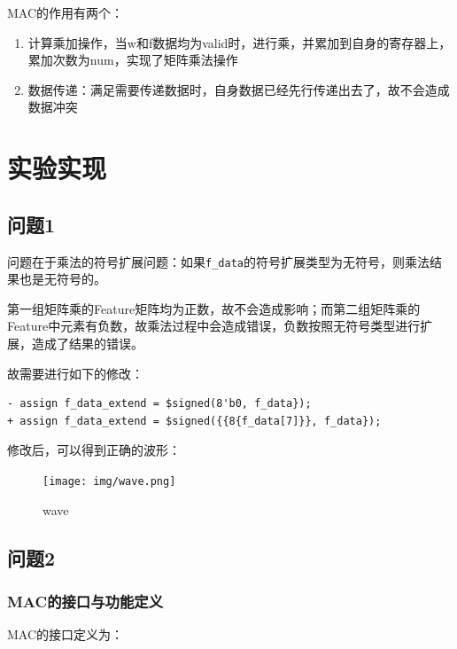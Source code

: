 \documentclass[12pt,a4paper]{article}
\begin{document}
MAC的作用有两个：

\begin{enumerate}
\item
  计算乘加操作，当w和f数据均为valid时，进行乘，并累加到自身的寄存器上，累加次数为num，实现了矩阵乘法操作
\item
  数据传递：满足需要传递数据时，自身数据已经先行传递出去了，故不会造成数据冲突
\end{enumerate}

\section{实验实现}

\subsection{问题1}

问题在于乘法的符号扩展问题：如果\texttt{f\_data}的符号扩展类型为无符号，则乘法结果也是无符号的。

第一组矩阵乘的Feature矩阵均为正数，故不会造成影响；而第二组矩阵乘的Feature中元素有负数，故乘法过程中会造成错误，负数按照无符号类型进行扩展，造成了结果的错误。

故需要进行如下的修改：

\begin{lstlisting}
- assign f_data_extend = $signed(8'b0, f_data});
+ assign f_data_extend = $signed({{8{f_data[7]}}, f_data});
\end{lstlisting}

修改后，可以得到正确的波形：

\begin{figure}[htbp]
    \centering
    \texttt{[image: img/wave.png]}
    \caption{wave}
\end{figure} 

\subsection{问题2}

\subsubsection{MAC的接口与功能定义}

MAC的接口定义为：
\end{document}
